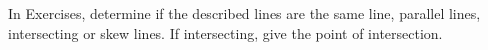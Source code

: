 \begin{exerciseset}{In Exercises}{, determine if the described lines are the same line, parallel lines, intersecting or skew lines. If intersecting, give the point of intersection.}

\end{exerciseset}
